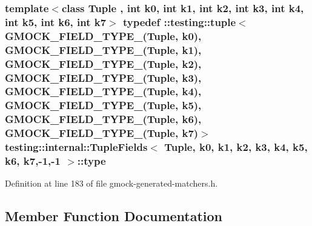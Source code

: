 \subsubsection[{\texorpdfstring{type}{type}}]{\setlength{\rightskip}{0pt plus 5cm}template$<$class Tuple , int k0, int k1, int k2, int k3, int k4, int k5, int k6, int k7$>$ typedef \+::testing\+::tuple$<${\bf G\+M\+O\+C\+K\+\_\+\+F\+I\+E\+L\+D\+\_\+\+T\+Y\+P\+E\+\_\+}(Tuple, k0), {\bf G\+M\+O\+C\+K\+\_\+\+F\+I\+E\+L\+D\+\_\+\+T\+Y\+P\+E\+\_\+}(Tuple, k1), {\bf G\+M\+O\+C\+K\+\_\+\+F\+I\+E\+L\+D\+\_\+\+T\+Y\+P\+E\+\_\+}(Tuple, k2), {\bf G\+M\+O\+C\+K\+\_\+\+F\+I\+E\+L\+D\+\_\+\+T\+Y\+P\+E\+\_\+}(Tuple, k3), {\bf G\+M\+O\+C\+K\+\_\+\+F\+I\+E\+L\+D\+\_\+\+T\+Y\+P\+E\+\_\+}(Tuple, k4), {\bf G\+M\+O\+C\+K\+\_\+\+F\+I\+E\+L\+D\+\_\+\+T\+Y\+P\+E\+\_\+}(Tuple, k5), {\bf G\+M\+O\+C\+K\+\_\+\+F\+I\+E\+L\+D\+\_\+\+T\+Y\+P\+E\+\_\+}(Tuple, k6), {\bf G\+M\+O\+C\+K\+\_\+\+F\+I\+E\+L\+D\+\_\+\+T\+Y\+P\+E\+\_\+}(Tuple, k7)$>$ {\bf testing\+::internal\+::\+Tuple\+Fields}$<$ Tuple, k0, k1, k2, k3, k4, k5, k6, k7,-\/1,-\/1 $>$\+::{\bf type}}\hypertarget{classtesting_1_1internal_1_1_tuple_fields_3_01_tuple_00_01k0_00_01k1_00_01k2_00_01k3_00_01k4_00_0063f8a87602abfee3b4568185bc2c75_a391bb0758025c4f9238011be4bf6c1d1}{}\label{classtesting_1_1internal_1_1_tuple_fields_3_01_tuple_00_01k0_00_01k1_00_01k2_00_01k3_00_01k4_00_0063f8a87602abfee3b4568185bc2c75_a391bb0758025c4f9238011be4bf6c1d1}


Definition at line 183 of file gmock-\/generated-\/matchers.\+h.



\subsection{Member Function Documentation}

